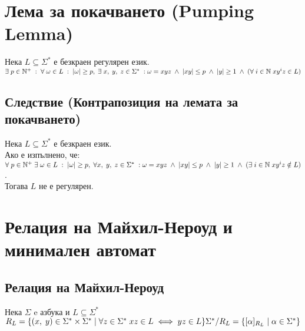 \documentclass[12pt]{article}
\newcommand{\N}{\mathbb{N}}
\begin{document}
\section*{Лема за покачването (Pumping Lemma)}

Нека $L \subseteq \Sigma^*$ е безкраен регулярен език. \\

$\exists \; p \in \N^+ \; : \; \forall \; \omega \in L \; : \; |\omega| \geq p, \; \exists \; x, \; y, \; z \in \Sigma^* \; : \\\\
\omega = xyz \; \land \; |xy| \leq p \; \land \; |y| \geq 1 \; \land \; (\forall \; i \in \N \; xy^iz \in L) $

\subsection*{Следствие (Контрапозиция на лемата за покачването)}

Нека $L \subseteq \Sigma^*$ е безкраен език. \\

Ако е изпълнено, че: \\
 
$\forall \; p \in \N^+ \; \exists \; \omega \in L \; : \; |\omega| \geq p, \; \forall x, \; y, \; z \in \Sigma^* \; : \\\\
 \omega = xyz \; \land \; |xy| \leq p \; \land \; |y| \geq 1 \; \land \; (\exists \; i \in \N \; xy^iz \notin L) $. \\

Тогава $L$ не е регулярен.

\section*{Релация на Майхил-Нероуд и минимален автомат}

\subsection*{Релация на Майхил-Нероуд}

Нека $\Sigma$ e азбука и $L \subseteq \Sigma^*$ \\

$R_L = \{(x, \; y) \in \Sigma^*\times\Sigma^* \; | \; \forall z \in \Sigma^* \; xz \in L \iff yz \in L\} \\\\
\Sigma^*/R_L = \{[\alpha]_{R_L} \; | \; \alpha \in \Sigma^*\}$
\end{document}
